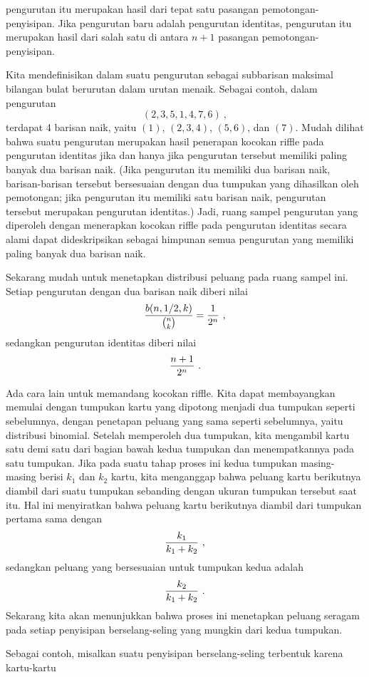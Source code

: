 pengurutan itu merupakan hasil dari tepat satu pasangan pemotongan-penyisipan.  Jika
pengurutan baru adalah pengurutan identitas, pengurutan itu merupakan hasil dari salah
satu di antara $n+1$ pasangan pemotongan-penyisipan.
\par Kita mendefinisikan  dalam suatu pengurutan
sebagai subbarisan maksimal bilangan bulat berurutan dalam urutan menaik.  Sebagai contoh,
dalam pengurutan
$$(2, 3, 5, 1, 4, 7, 6)\ ,$$
terdapat 4 barisan naik, yaitu $(1)$, $(2, 3, 4)$, $(5, 6)$, dan $(7)$.  Mudah dilihat
bahwa suatu pengurutan merupakan hasil penerapan kocokan riffle pada pengurutan identitas
jika dan hanya jika pengurutan tersebut memiliki paling banyak dua barisan naik.  (Jika
pengurutan itu memiliki dua barisan naik, barisan-barisan tersebut bersesuaian dengan dua
tumpukan yang dihasilkan oleh pemotongan; jika pengurutan itu memiliki satu barisan naik,
pengurutan tersebut merupakan pengurutan identitas.)  Jadi, ruang sampel pengurutan yang
diperoleh dengan menerapkan kocokan riffle pada pengurutan identitas secara alami dapat
dideskripsikan sebagai himpunan semua pengurutan yang memiliki paling banyak dua barisan
naik.
\par Sekarang mudah untuk menetapkan distribusi peluang pada ruang sampel ini.  Setiap
pengurutan dengan dua barisan naik diberi nilai
$${{b(n, 1/2, k)}\over{{{n}\choose{k}}}} = {1\over{2^n}}\ ,$$ sedangkan pengurutan
identitas diberi nilai
$${{n+1}\over{2^n}}\ .$$
\par Ada cara lain untuk memandang kocokan riffle.  Kita dapat membayangkan memulai dengan
tumpukan kartu yang dipotong menjadi dua tumpukan seperti sebelumnya, dengan penetapan
peluang yang sama seperti sebelumnya, yaitu distribusi binomial.  Setelah memperoleh dua
tumpukan, kita mengambil kartu satu demi satu dari bagian bawah kedua tumpukan dan
menempatkannya pada satu tumpukan.  Jika pada suatu tahap proses ini kedua tumpukan
masing-masing berisi $k_1$ dan $k_2$ kartu, kita menganggap bahwa peluang kartu berikutnya
diambil dari suatu tumpukan sebanding dengan ukuran tumpukan tersebut saat itu.  Hal ini
menyiratkan bahwa peluang kartu berikutnya diambil dari tumpukan pertama sama dengan
$${{k_1}\over{k_1 + k_2}}\ ,$$
sedangkan peluang yang bersesuaian untuk tumpukan kedua adalah
$${{k_2}\over{k_1 + k_2}}\ .$$
Sekarang kita akan menunjukkan bahwa proses ini menetapkan peluang seragam pada setiap
penyisipan berselang-seling yang mungkin dari kedua tumpukan.
\par 
Sebagai contoh, misalkan suatu penyisipan berselang-seling terbentuk karena kartu-kartu
